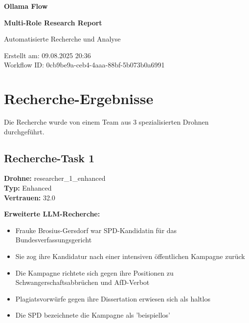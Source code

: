 \documentclass[12pt,a4paper]{article}
\begin{document}
\begin{titlepage}
    \centering
    
    \vspace*{2cm}
    
    {\Huge\bfseries Ollama Flow}
    
    {\Huge\bfseries Multi-Role Research Report}
    
    \vspace{2cm}
    
    {\Large Automatisierte Recherche und Analyse}
    
    \vspace{3cm}
    
    
    \vspace{2cm}
    
    
    \vfill
    
    {\large
    Erstellt am: 09.08.2025 20:36\\
    Workflow ID: 0cb9be9a-ceb4-4aaa-88bf-5b073b0a6991
    }
    
\end{titlepage}

\newpage
\tableofcontents
\newpage

\section{Recherche-Ergebnisse}

Die Recherche wurde von einem Team aus 3 spezialisierten Drohnen durchgeführt.

\subsection{Recherche-Task 1}

\textbf{Drohne:} researcher\_1\_enhanced\\
\textbf{Typ:} Enhanced\\
\textbf{Vertrauen:} 32.0%

\textbf{Erweiterte LLM-Recherche:}
\begin{itemize}
\item Frauke Brosius-Gersdorf war SPD-Kandidatin für das Bundesverfassungsgericht
\item Sie zog ihre Kandidatur nach einer intensiven öffentlichen Kampagne zurück
\item Die Kampagne richtete sich gegen ihre Positionen zu Schwangerschaftsabbrüchen und AfD-Verbot
\item Plagiatsvorwürfe gegen ihre Dissertation erwiesen sich als haltlos
\item Die SPD bezeichnete die Kampagne als 'beispiellos'
\end{itemize}
\end{document}
